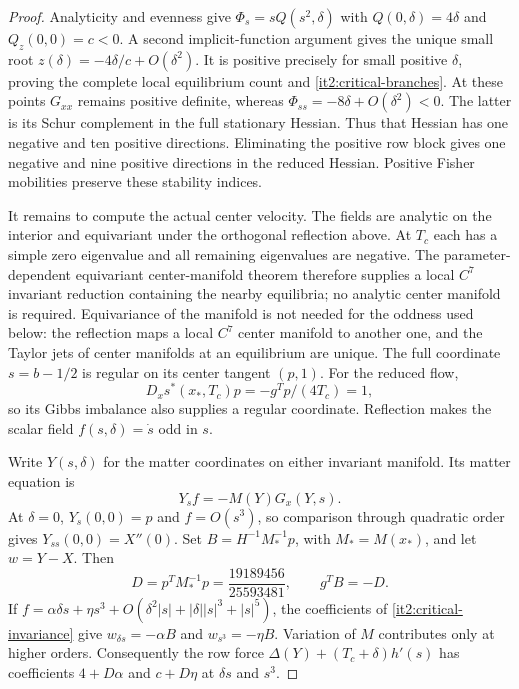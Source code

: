 \begin{proof}
Analyticity and evenness give $\Phi_s=sQ(s^2,\delta)$ with $Q(0,\delta)=4\delta$ and $Q_z(0,0)=c<0$. A second implicit-function argument gives the unique small root $z(\delta)=-4\delta/c+O(\delta^2)$. It is positive precisely for small positive $\delta$, proving the complete local equilibrium count and \cref{it2:critical-branches}. At these points $G_{xx}$ remains positive definite, whereas $\Phi_{ss}=-8\delta+O(\delta^2)<0$. The latter is its Schur complement in the full stationary Hessian. Thus that Hessian has one negative and ten positive directions. Eliminating the positive row block gives one negative and nine positive directions in the reduced Hessian. Positive Fisher mobilities preserve these stability indices.

It remains to compute the actual center velocity. The fields are analytic on the interior and equivariant under the orthogonal reflection above. At $T_c$ each has a simple zero eigenvalue and all remaining eigenvalues are negative. The parameter-dependent equivariant center-manifold theorem \citep[Theorem~1.2]{Ruelle1973Symmetry} therefore supplies a local $C^7$ invariant reduction containing the nearby equilibria; no analytic center manifold is required. Equivariance of the manifold is not needed for the oddness used below: the reflection maps a local $C^7$ center manifold to another one, and the Taylor jets of center manifolds at an equilibrium are unique. The full coordinate $s=b-1/2$ is regular on its center tangent $(p,1)$. For the reduced flow,
\begin{equation}
 D_xs^*(x_*,T_c)p=-g^Tp/(4T_c)=1,
 \label{it2:critical-reduced-coordinate}
\end{equation}
so its Gibbs imbalance also supplies a regular coordinate. Reflection makes the scalar field $f(s,\delta)=\dot s$ odd in $s$.

Write $Y(s,\delta)$ for the matter coordinates on either invariant manifold. Its matter equation is
\begin{equation}
 Y_s f=-M(Y)G_x(Y,s).
 \label{it2:critical-invariance}
\end{equation}
At $\delta=0$, $Y_s(0,0)=p$ and $f=O(s^3)$, so comparison through quadratic order gives $Y_{ss}(0,0)=X''(0)$. Set $B=H^{-1}M_*^{-1}p$, with $M_*=M(x_*)$, and let $w=Y-X$. Then
\begin{equation}
 D=p^TM_*^{-1}p=\frac{19189456}{25593481},\qquad g^TB=-D.
 \label{it2:critical-metric-length}
\end{equation}
If $f=\alpha\delta s+\eta s^3+O(\delta^2|s|+|\delta||s|^3+|s|^5)$, the coefficients of \cref{it2:critical-invariance} give $w_{\delta s}=-\alpha B$ and $w_{s^3}=-\eta B$. Variation of $M$ contributes only at higher orders. Consequently the row force $\Delta(Y)+(T_c+\delta)h'(s)$ has coefficients $4+D\alpha$ and $c+D\eta$ at $\delta s$ and $s^3$.


\end{proof}
